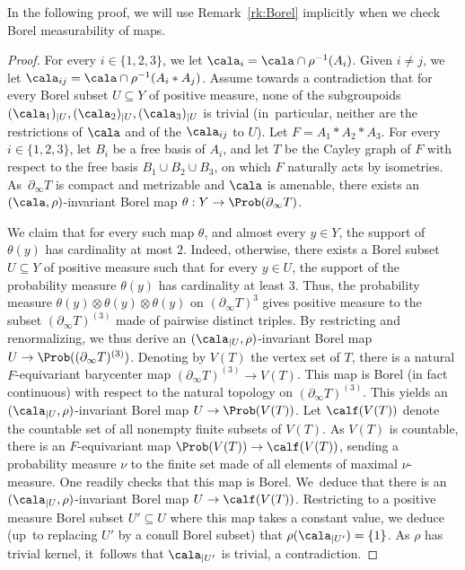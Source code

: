 In the following proof, we will use Remark~\ref{rk:Borel} implicitly when we check Borel measurability of maps.

\begin{proof}
For every $i\in\{1,2,3\}$, we let $\cala_i=\cala\cap\rho^{-1}(A_i)$. Given $i\neq j$, we let $\cala_{ij}=\cala\cap\rho^{-1}(A_i\ast A_j)$. Assume towards a contradiction that for every Borel subset $U\subseteq Y$ of positive measure, none of the subgroupoids $(\cala_1)_{|U},(\cala_2)_{|U},(\cala_3)_{|U}$ is trivial (in~par\-ticular, neither are the restrictions of $\cala$ and of the $\cala_{ij}$ to $U$). Let $F=A_1\ast A_2\ast A_3$. For every $i\in\{1,2,3\}$, let $B_i$ be a free basis of $A_i$, and let $T$ be the Cayley graph of $F$ with respect to the free basis $B_1\cup B_2\cup B_3$, on which $F$ naturally acts by isometries. As~$\partial_\infty T$ is compact and metrizable and $\cala$ is amenable, there exists an $(\cala,\rho)$-invariant Borel map $\theta:Y\to \Prob(\partial_\infty T)$.

We claim that for every such map $\theta$, and almost every $y\in Y$, the support of $\theta(y)$ has cardinality at most $2$. Indeed, otherwise, there exists a Borel subset $U\subseteq Y$ of positive measure such that for every $y\in U$, the support of the probability measure $\theta(y)$ has cardinality at least $3$. Thus, the probability measure $\theta(y)\otimes\theta(y)\otimes\theta(y)$ on $(\partial_\infty T)^3$ gives positive measure to the subset $(\partial_\infty T)^{(3)}$ made of pairwise distinct triples. By restricting and renormalizing, we thus derive an $(\cala_{|U},\rho)$-invariant Borel map $U\to\Prob((\partial_\infty T)^{(3)})$. Denoting by $V(T)$ the vertex set of $T$, there is a natural $F$-equivariant barycenter map $(\partial_\infty T)^{(3)}\to V(T)$. This map is Borel (in fact continuous) with respect to the natural topology on $(\partial_\infty T)^{(3)}$. This yields an $(\cala_{|U},\rho)$-invariant Borel map $U\to\Prob(V(T))$. Let $\calf(V(T))$ denote the countable set of all nonempty finite subsets of $V(T)$. As $V(T)$ is countable, there is an $F$-equivariant map $\Prob(V(T))\to\calf(V(T))$, sending a probability measure $\nu$ to the finite set made of all elements of maximal $\nu$-measure. One readily checks that this map is Borel. We~deduce that there is an $(\cala_{|U},\rho)$-invariant Borel map $U\to\calf(V(T))$. Restricting to a positive measure Borel subset $U'\subseteq U$ where this map takes a constant value, we deduce (up~to replacing $U'$ by a conull Borel subset) that $\rho(\cala_{|U'})=\{1\}$. As $\rho$ has trivial kernel, it~follows that $\cala_{|U'}$ is trivial, a contradiction.


\end{proof}

